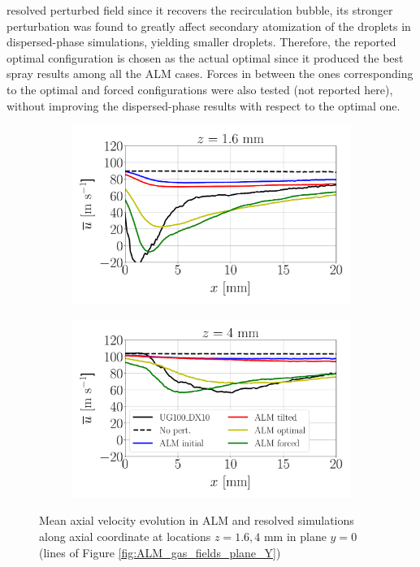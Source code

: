 resolved perturbed field since it recovers the recirculation bubble, its stronger perturbation was found to greatly affect secondary atomization of the droplets in dispersed-phase simulations, yielding smaller droplets. Therefore, the reported optimal configuration is chosen as the actual optimal since it produced the best spray results among all the ALM cases. Forces in between the ones corresponding to the optimal and forced configurations were also tested (not reported here), without improving the dispersed-phase results with respect to the optimal one.





\begin{figure}[ht]
\flushleft
\begin{subfigure}[b]{0.45\textwidth}
	\centering
   \includegraphics[scale=0.25]{./part2_developments/figures_ch6_lagrangian_JICF/gas_field_initial_conditions/ALM_line_y0_along_x_z01p6}
\end{subfigure}
\hspace{0.4in}
\begin{subfigure}[b]{0.45\textwidth}
	\centering
   \includegraphics[scale=0.25]{./part2_developments/figures_ch6_lagrangian_JICF/gas_field_initial_conditions/ALM_line_y0_along_x_z04p0}
\end{subfigure}
\caption{Mean axial velocity evolution in ALM and resolved simulations along axial coordinate at locations $z = 1.6, 4$ mm in plane $y = 0$ (lines of Figure \ref{fig:ALM_gas_fields_plane_Y})}
\label{fig:JICF_ICS_ALM_lines_y0_along_x_ux_mean}
\end{figure}

